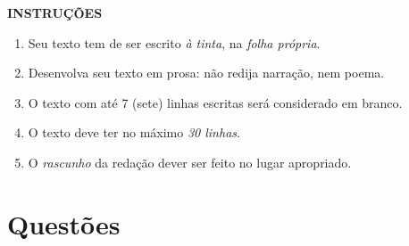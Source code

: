 \documentclass[10pt,a4paper]{article}
\begin{document}
\textbf{INSTRU\c{C}\~OES} \\
\begin{enumerate}
\item Seu texto tem de ser escrito \emph{\`a tinta}, na \emph{folha pr\'opria}.
\item Desenvolva seu texto em prosa: n\~ao redija narra\c{c}\~ao, nem poema.
\item O texto com at\'e 7 (sete) linhas escritas ser\'a considerado em branco.
\item O texto deve ter no m\'aximo \emph{30 linhas}.
\item O \emph{rascunho} da reda\c{c}\~ao dever ser feito no lugar apropriado.
\end{enumerate}


\section*{Quest\~{o}es}
\end{document}
